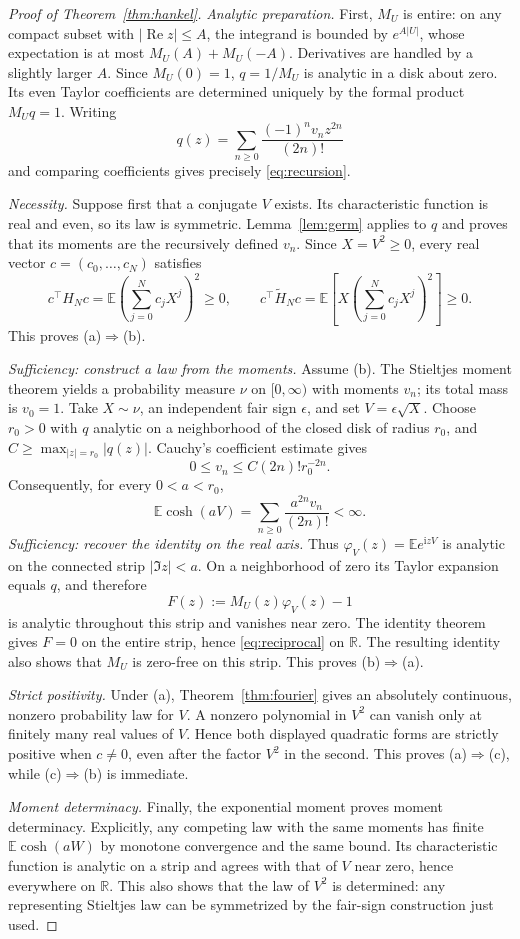 \documentclass[11pt,twoside]{article}
\theoremstyle{journalplain}
\numberwithin{equation}{section}
\theoremstyle{journaldefinition}
\newcommand{\R}{\mathbb R}
\newcommand{\E}{\mathbb E}
\newcommand{\ii}{\mathrm i}
\DeclareMathOperator{\Ree}{Re}
\begin{document}
\begin{proof}[Proof of Theorem~\ref{thm:hankel}]
\emph{Analytic preparation.} First, $M_U$ is entire: on any compact subset with $|\Ree z|\le A$, the integrand is bounded by $e^{A|U|}$, whose expectation is at most $M_U(A)+M_U(-A)$. Derivatives are handled by a slightly larger $A$. Since $M_U(0)=1$, $q=1/M_U$ is analytic in a disk about zero. Its even Taylor coefficients are determined uniquely by the formal product $M_Uq=1$. Writing
\[
 q(z)=\sum_{n\ge0}\frac{(-1)^nv_n z^{2n}}{(2n)!}
\]
and comparing coefficients gives precisely \eqref{eq:recursion}.

\emph{Necessity.} Suppose first that a conjugate $V$ exists. Its characteristic function is real and even, so its law is symmetric. Lemma~\ref{lem:germ} applies to $q$ and proves that its moments are the recursively defined $v_n$. Since $X=V^2\ge0$, every real vector $c=(c_0,\ldots,c_N)$ satisfies
\[
 c^\top H_Nc=\E\left(\sum_{j=0}^Nc_jX^j\right)^2\ge0,
 \qquad
 c^\top\widetilde H_Nc=\E\left[X\left(\sum_{j=0}^Nc_jX^j\right)^2\right]\ge0.
\]
This proves (a)$\Rightarrow$(b).

\emph{Sufficiency: construct a law from the moments.} Assume (b). The Stieltjes moment theorem yields a probability measure $\nu$ on $[0,\infty)$ with moments $v_n$; its total mass is $v_0=1$. Take $X\sim\nu$, an independent fair sign $\epsilon$, and set $V=\epsilon\sqrt X$. Choose $r_0>0$ with $q$ analytic on a neighborhood of the closed disk of radius $r_0$, and $C\ge\max_{|z|=r_0}|q(z)|$. Cauchy's coefficient estimate gives
\[
 0\le v_n\le C(2n)!r_0^{-2n}.
\]
Consequently, for every $0<a<r_0$,
\[
 \E\cosh(aV)=\sum_{n\ge0}\frac{a^{2n}v_n}{(2n)!}<\infty.
\]
\emph{Sufficiency: recover the identity on the real axis.} Thus $\varphi_V(z)=\E e^{\ii zV}$ is analytic on the connected strip $|\Im z|<a$. On a neighborhood of zero its Taylor expansion equals $q$, and therefore
\[
 F(z):=M_U(z)\varphi_V(z)-1
\]
is analytic throughout this strip and vanishes near zero. The identity theorem gives $F=0$ on the entire strip, hence \eqref{eq:reciprocal} on $\R$. The resulting identity also shows that $M_U$ is zero-free on this strip. This proves (b)$\Rightarrow$(a).

\emph{Strict positivity.} Under (a), Theorem~\ref{thm:fourier} gives an absolutely continuous, nonzero probability law for $V$. A nonzero polynomial in $V^2$ can vanish only at finitely many real values of $V$. Hence both displayed quadratic forms are strictly positive when $c\ne0$, even after the factor $V^2$ in the second. This proves (a)$\Rightarrow$(c), while (c)$\Rightarrow$(b) is immediate.

\emph{Moment determinacy.} Finally, the exponential moment proves moment determinacy. Explicitly, any competing law with the same moments has finite $\E\cosh(aW)$ by monotone convergence and the same bound. Its characteristic function is analytic on a strip and agrees with that of $V$ near zero, hence everywhere on $\R$. This also shows that the law of $V^2$ is determined: any representing Stieltjes law can be symmetrized by the fair-sign construction just used.
\end{proof}
\end{document}
